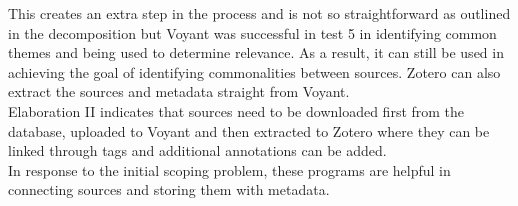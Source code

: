 \documentclass{article}
\begin{document}
This creates an extra step in the process and is not so straightforward as outlined in the decomposition but Voyant was successful in test 5 in identifying common themes and being used to determine relevance. As a result, it can still be used in achieving the goal of identifying commonalities between sources. Zotero can also extract the sources and metadata straight from Voyant.\\
Elaboration II indicates that sources need to be downloaded first from the database, uploaded to Voyant and then extracted to Zotero where they can be linked through tags and additional annotations can be added. \\
In response to the initial scoping problem, these programs are helpful in connecting sources and storing them with metadata. 
\end{document}
